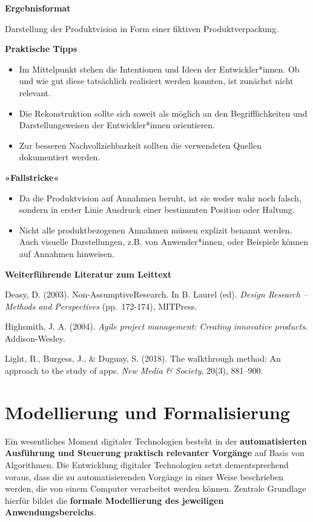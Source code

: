 \documentclass[
  a4paper,
]{book}
\providecommand{\tightlist}{%
  \setlength{\itemsep}{0pt}\setlength{\parskip}{0pt}}
\begin{document}
\textbf{Ergebnisformat}

Darstellung der Produktvision in Form einer fiktiven Produktverpackung.

\textbf{Praktische Tipps}

\begin{itemize}
\tightlist
\item
  Im Mittelpunkt stehen die Intentionen und Ideen der Entwickler*innen. Ob und wie gut diese tatsächlich realisiert werden konnten, ist zunächst nicht relevant.
\item
  Die Rekonstruktion sollte sich soweit als möglich an den Begrifflichkeiten und Darstellungsweisen der Entwickler*innen orientieren.
\item
  Zur besseren Nachvollziehbarkeit sollten die verwendeten Quellen dokumentiert werden.
\end{itemize}

\textbf{»Fallstricke«}

\begin{itemize}
\tightlist
\item
  Da die Produktvision auf Annahmen beruht, ist sie weder wahr noch falsch, sondern in erster Linie Ausdruck einer bestimmten Position oder Haltung.
\item
  Nicht alle produktbezogenen Annahmen müssen explizit benannt werden. Auch visuelle Darstellungen, z.B. von Anwender*innen, oder Beispiele können auf Annahmen hinweisen.
\end{itemize}

\textbf{Weiterführende Literatur zum Leittext}

Deasy, D. (2003). Non-AssumptiveResearch. In B. Laurel (ed). \emph{Design Research --Methods and Perspectives} (pp.~172-174), MITPress.

Highsmith, J. A. (2004). \emph{Agile project management: Creating innovative products}. Addison-Wesley.

Light, B., Burgess, J., \& Duguay, S. (2018). The walkthrough method: An approach to the study of apps. \emph{New Media \& Society}, 20(3), 881--900.

\chapter{Modellierung und Formalisierung}\label{modellierung-und-formalisierung}

Ein wesentliches Moment digitaler Technologien besteht in der \textbf{automatisierten Ausführung und Steuerung praktisch relevanter Vorgänge} auf Basis von Algorithmen. Die Entwicklung digitaler Technologien setzt dementsprechend voraus, dass die zu automatisierenden Vorgänge in einer Weise beschrieben werden, die von einem Computer verarbeitet werden können. Zentrale Grundlage hierfür bildet die \textbf{formale Modellierung des jeweiligen Anwendungsbereichs}.
\end{document}
